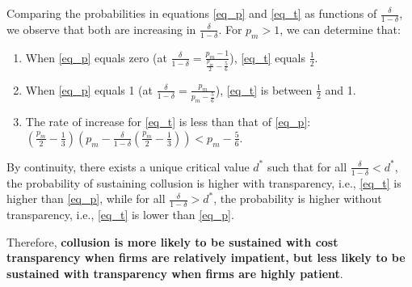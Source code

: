\documentclass[12pt]{article}
\begin{document}
Comparing the probabilities in equations \eqref{eq_p} and \eqref{eq_t} as functions of $\frac{\delta}{1-\delta}$, we observe that both are increasing in $\frac{\delta}{1-\delta}$. For $p_m>1$, we can determine that:
\begin{enumerate}
    \item When \eqref{eq_p} equals zero (at $\frac{\delta}{1-\delta}=\frac{p_m-1}{\frac{p_m}{2}-\frac{5}{6}}$), \eqref{eq_t} equals $\frac{1}{2}$.
    \item When \eqref{eq_p} equals 1 (at $\frac{\delta}{1-\delta}=\frac{p_m}{p_m-\frac{5}{6}}$), \eqref{eq_t} is between $\frac{1}{2}$ and 1.
    \item The rate of increase for \eqref{eq_t} is less than that of \eqref{eq_p}: $\left(\frac{p_m}{2}-\frac{1}{3}\right)\left(p_m-\frac{\delta}{1-\delta}\left(\frac{p_m}{2}-\frac{1}{3}\right)\right)<p_m-\frac{5}{6}$.
\end{enumerate}

By continuity, there exists a unique critical value $d^*$ such that for all $\frac{\delta}{1-\delta}<d^*$, the probability of sustaining collusion is higher with transparency, i.e., \eqref{eq_t} is higher than \eqref{eq_p}, while for all $\frac{\delta}{1-\delta}>d^*$, the probability is higher without transparency, i.e., \eqref{eq_t} is lower than \eqref{eq_p}.

Therefore, \textbf{collusion is more likely to be sustained with cost transparency when firms are relatively impatient, but less likely to be sustained with transparency when firms are highly patient}.
\end{document}
